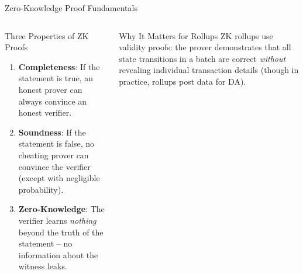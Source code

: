 \documentclass[8pt,aspectratio=169]{beamer}
\begin{document}
\begin{frame}{Zero-Knowledge Proof Fundamentals}
\vspace{-1mm}
\begin{columns}[T]
\begin{block}{Three Properties of ZK Proofs}
\footnotesize
\begin{enumerate}\setlength\itemsep{4pt}
  \item \textbf{Completeness}: If the statement is true, an honest prover can always convince an honest verifier.
  \item \textbf{Soundness}: If the statement is false, no cheating prover can convince the verifier (except with negligible probability).
  \item \textbf{Zero-Knowledge}: The verifier learns \textit{nothing} beyond the truth of the statement -- no information about the witness leaks.
\end{enumerate}
\end{block}
\vspace{2mm}
\begin{alertblock}{Why It Matters for Rollups}
\footnotesize
ZK rollups use validity proofs: the prover demonstrates that all state transitions in a batch are correct \textit{without} revealing individual transaction details (though in practice, rollups post data for DA).
\end{alertblock}
\vspace{2mm}
\end{columns}
\end{frame}
\end{document}
